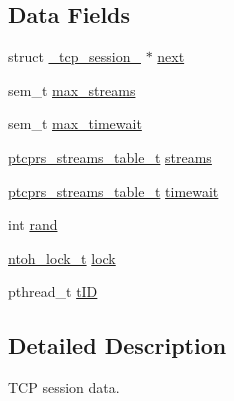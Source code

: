 \subsection*{Data Fields}
\begin{DoxyCompactItemize}
\item 
struct \hyperlink{struct__tcp__session__}{\-\_\-tcp\-\_\-session\-\_\-} $\ast$ \hyperlink{struct__tcp__session___ae866f522c9fbdac668c33af1a598e86f}{next}
\item 
sem\-\_\-t \hyperlink{struct__tcp__session___a8c7b43ddca940d13003768fbd6897aca}{max\-\_\-streams}
\item 
sem\-\_\-t \hyperlink{struct__tcp__session___a0ad4a79087f65efc1af3127c9d9f43a5}{max\-\_\-timewait}
\item 
\hyperlink{tcpreassembly_8h_ae455978c868a3bf1a0708d96932f956a}{ptcprs\-\_\-streams\-\_\-table\-\_\-t} \hyperlink{struct__tcp__session___a5675d32788db8bd40535c108977e8560}{streams}
\item 
\hyperlink{tcpreassembly_8h_ae455978c868a3bf1a0708d96932f956a}{ptcprs\-\_\-streams\-\_\-table\-\_\-t} \hyperlink{struct__tcp__session___a6d12e7905e23f6fd93efd111d40af43c}{timewait}
\item 
int \hyperlink{struct__tcp__session___a19eadb5789a5d63300429365870ec81f}{rand}
\item 
\hyperlink{structntoh__lock__t}{ntoh\-\_\-lock\-\_\-t} \hyperlink{struct__tcp__session___aad15823e4f2835531e6a02321cd53f7e}{lock}
\item 
pthread\-\_\-t \hyperlink{struct__tcp__session___ab10186c154259d2b4ed2d25b7e23ed17}{t\-I\-D}
\end{DoxyCompactItemize}


\subsection{Detailed Description}
T\-C\-P session data. 

